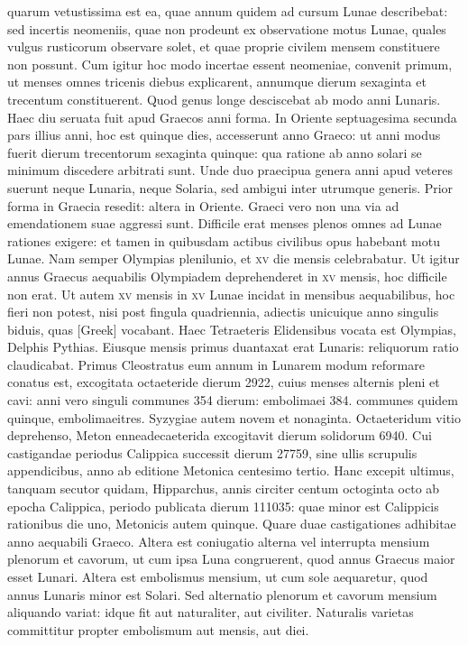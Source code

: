 quarum vetustissima est ea, quae annum quidem ad cursum
Lunae describebat:
sed incertis neomeniis, quae non prodeunt ex observatione
motus Lunae, quales vulgus rusticorum observare solet, et
quae proprie civilem mensem constituere non possunt.
Cum igitur
hoc modo incertae essent neomeniae, convenit primum, ut menses omnes
tricenis diebus explicarent, annumque dierum sexaginta et trecentum
constituerent.
Quod genus longe desciscebat ab modo anni
Lunaris.
Haec diu seruata fuit apud Graecos anni forma.
In Oriente
septuagesima secunda pars illius anni, hoc est quinque dies, accesserunt
anno Graeco: ut anni modus fuerit dierum trecentorum sexaginta quinque:
qua ratione ab anno solari se minimum discedere arbitrati sunt.
Unde duo praecipua genera anni apud veteres suerunt neque Lunaria,
neque Solaria, sed ambigui inter utrumque generis.
Prior forma in
Graecia resedit: altera in Oriente.
Graeci vero non una via ad emendationem
suae aggressi sunt.
Difficile erat menses plenos omnes ad
Lunae rationes exigere: et tamen in quibusdam actibus civilibus opus
habebant motu Lunae.
Nam semper Olympias plenilunio, et \textsc{xv}
die mensis celebrabatur.
Ut igitur annus Graecus aequabilis Olympiadem
deprehenderet in \textsc{xv} mensis, hoc difficile non erat.
Ut autem
\textsc{xv} mensis in \textsc{xv}
 Lunae incidat in mensibus aequabilibus, hoc fieri non
potest, nisi post fingula quadriennia, adiectis unicuique anno singulis
biduis, quas \textgreek{[Greek]} vocabant.
Haec Tetraeteris Elidensibus
vocata est Olympias, Delphis Pythias.
Eiusque mensis primus duantaxat
erat Lunaris: reliquorum ratio claudicabat.
Primus Cleostratus
eum annum in Lunarem modum reformare conatus est, excogitata
octaeteride dierum 2922, cuius menses alternis pleni et cavi: anni vero
singuli communes 354 dierum: embolimaei 384. communes quidem
quinque, embolimaeitres.
Syzygiae autem novem et nonaginta.
Octaeteridum
vitio deprehenso, Meton enneadecaeterida excogitavit dierum
solidorum 6940.
Cui castigandae periodus Calippica successit dierum
27759, sine ullis scrupulis appendicibus, anno ab editione Metonica
centesimo tertio.
Hanc excepit ultimus, tanquam secutor quidam,
Hipparchus, annis circiter centum octoginta octo ab epocha Calippica,
periodo publicata dierum 111035: quae minor est Calippicis rationibus
die uno, Metonicis autem quinque.
Quare duae castigationes adhibitae
anno aequabili Graeco.
Altera est coniugatio alterna vel interrupta
mensium plenorum et cavorum, ut cum ipsa Luna congruerent, quod
annus Graecus maior esset Lunari.
Altera est embolismus mensium, ut
cum sole aequaretur, quod annus Lunaris minor est Solari.
Sed alternatio
plenorum et cavorum mensium aliquando variat: idque fit aut
naturaliter, aut civiliter.
Naturalis varietas committitur propter embolismum
aut mensis, aut diei.

